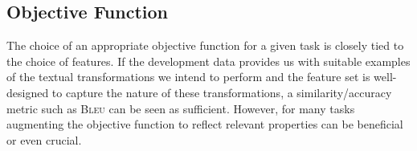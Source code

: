 \documentclass[11pt]{article}
\begin{document}

\subsection{Objective Function}

The choice of an appropriate objective function for a given task is
closely tied to the choice of features. If the development data
provides us with suitable examples of the textual transformations we
intend to perform and the feature set is well-designed to capture the
nature of these transformations, a similarity/accuracy metric such as
\textsc{Bleu} can be seen as sufficient. However, for many tasks
augmenting the objective function to reflect relevant properties can
be beneficial or even crucial.
\end{document}
